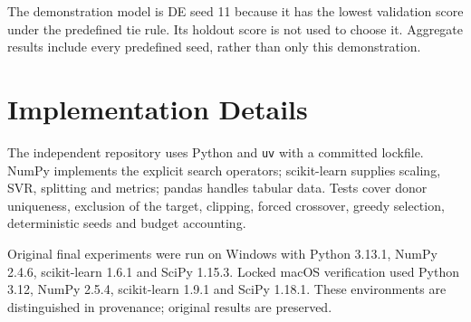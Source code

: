The demonstration model is DE seed 11 because it has the lowest validation score under the predefined tie rule. Its holdout score is not used to choose it. Aggregate results include every predefined seed, rather than only this demonstration.
\section{Implementation Details}
The independent repository uses Python and \texttt{uv} with a committed lockfile. NumPy implements the explicit search operators; scikit-learn supplies scaling, SVR, splitting and metrics; pandas handles tabular data. Tests cover donor uniqueness, exclusion of the target, clipping, forced crossover, greedy selection, deterministic seeds and budget accounting.

Original final experiments were run on Windows with Python 3.13.1, NumPy 2.4.6, scikit-learn 1.6.1 and SciPy 1.15.3. Locked macOS verification used Python 3.12, NumPy 2.5.4, scikit-learn 1.9.1 and SciPy 1.18.1. These environments are distinguished in provenance; original results are preserved.
